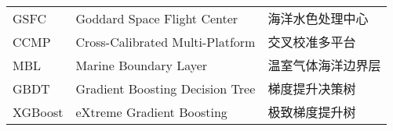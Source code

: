 \begin{center}
\begin{longtable}{m{3cm}<{\centering}m{7cm}<{\centering}m{5cm}<{\centering}}
        GSFC                                             &Goddard Space Flight Center                       &海洋水色处理中心\\
        CCMP                                             &Cross-Calibrated Multi-Platform                   &交叉校准多平台\\
        MBL                                              &Marine Boundary Layer                             &温室气体海洋边界层\\
        GBDT                                             &Gradient Boosting Decision Tree                   &梯度提升决策树 \\
        XGBoost                                          &eXtreme Gradient Boosting                         &极致梯度提升树 \\
	\end{longtable}
\end{center}